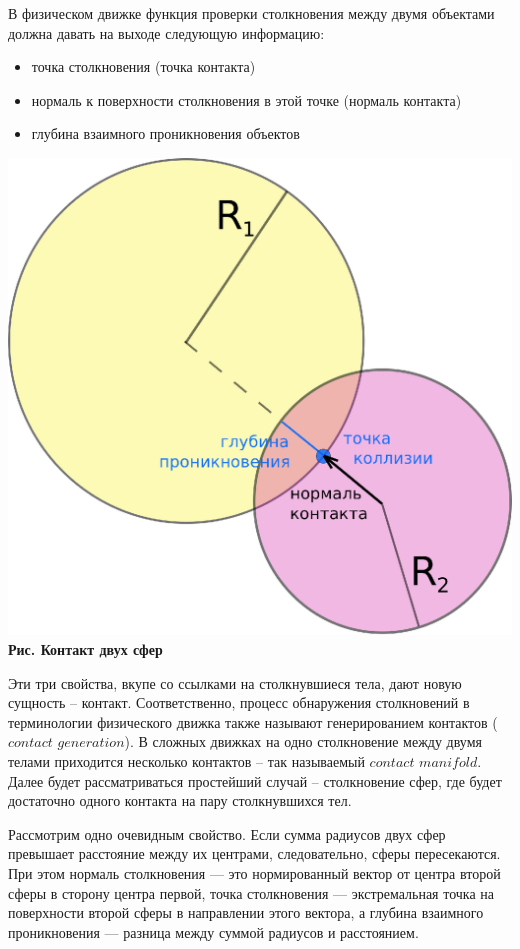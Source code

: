 В физическом движке функция проверки столкновения между двумя объектами должна давать на выходе следующую
информацию:
\begin{itemize}
  \item точка столкновения (точка контакта)
  \item нормаль к поверхности столкновения в этой точке (нормаль контакта)
  \item глубина взаимного проникновения объектов
\end{itemize}
\begin{center}
\includegraphics[scale=0.45]{./Geometry/SphereCollision.eps}  \\
\textbf{Рис. Контакт двух сфер}
\end{center}
Эти три свойства, вкупе со ссылками на столкнувшиеся тела, дают новую сущность – контакт. Соответственно,
процесс обнаружения столкновений в терминологии физического движка также называют генерированием
контактов ($contact$ $generation$). В сложных движках на одно столкновение между двумя телами приходится несколько
контактов – так называемый $contact$ $manifold$. Далее будет рассматриваться простейший случай – столкновение сфер, где будет
достаточно одного контакта на пару столкнувшихся тел.

Рассмотрим одно очевидным свойство. Если сумма радиусов двух сфер превышает расстояние между их центрами, следовательно, сферы пересекаются.
При этом нормаль столкновения --- это нормированный вектор от центра второй сферы в сторону центра первой,
точка столкновения --- экстремальная точка на поверхности второй сферы в направлении этого вектора, а глубина взаимного
проникновения --- разница между суммой радиусов и расстоянием.

